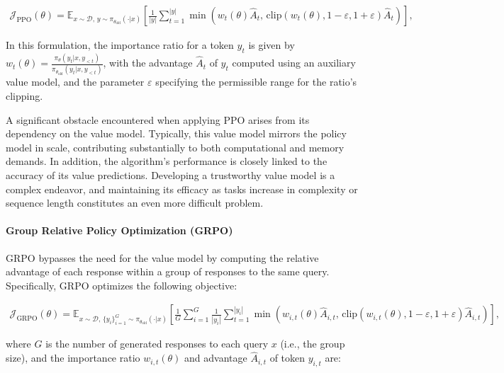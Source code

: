 \begin{align}
\mathcal{J}_\text{PPO}(\theta) = \mathbb{E}_{ x \sim \mathcal{D},\, y \sim \pi_{\theta_\text{old}}( \cdot | x) }
\left[ \frac{1}{|y|} \sum_{t=1}^{|y|} 
\min \left( w_{t}(\theta) \widehat{A}_{t},  \, \mathrm{clip} \left( w_{t}(\theta), 1 - {\varepsilon}, 1 + {\varepsilon}\right) \widehat{A}_{t} \right)
\right],
\end{align}

In this formulation, the importance ratio for a token $y_t$ is given by $
w_{t}(\theta) = \frac{ \pi_{\theta} (y_{t} | x, y_{<t}) }{ \pi_{\theta_\text{old}} (y_{t} | x,y_{<t})}
$, with the advantage $\widehat{A}_{t}$ of $y_t$ computed using an auxiliary value model, and the parameter $\varepsilon$ specifying the permissible range for the ratio's clipping.

A significant obstacle encountered when applying PPO arises from its dependency on the value model. Typically, this value model mirrors the policy model in scale, contributing substantially to both computational and memory demands. In addition, the algorithm’s performance is closely linked to the accuracy of its value predictions. Developing a trustworthy value model is a complex endeavor, and maintaining its efficacy as tasks increase in complexity or sequence length constitutes an even more difficult problem.

\paragraph{Group Relative Policy Optimization (GRPO)} GRPO \citep{grpo} bypasses the need for the value model by computing the relative advantage of each response within a group of responses to the same query. Specifically, GRPO optimizes the following objective:

\begin{align}
\label{equ:grpo}
\mathcal{J}_\text{GRPO}(\theta) = \mathbb{E}_{ x \sim \mathcal{D},\, \{y_i\}_{i=1}^G \sim \pi_{\theta_\text{old}}( \cdot | x) }
\left[ \frac{1}{G} \sum_{i=1}^{G} \frac{1}{|y_i|} \sum_{t=1}^{|y_i|} 
\min \left( w_{i,t}(\theta) \widehat{A}_{i,t},  \, \mathrm{clip} \left( w_{i,t}(\theta), 1 - {\varepsilon}, 1 + {\varepsilon}\right) \widehat{A}_{i,t} \right)
\right],
\end{align}

where $G$ is the number of generated responses to each query $x$ (i.e., the group size), and the importance ratio $w_{i,t}(\theta)$ and advantage $\widehat{A}_{i,t}$ of token $y_{i,t}$ are:

